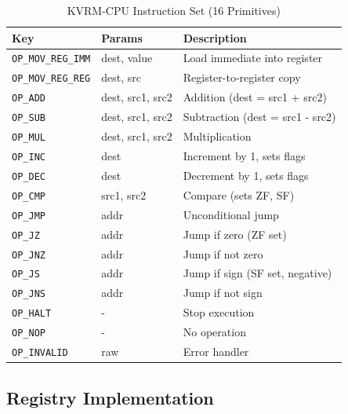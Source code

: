 \documentclass[11pt,a4paper]{article}
\begin{document}
\begin{table}[h]
\centering
\begin{tabular}{llp{6cm}}
\toprule
\textbf{Key} & \textbf{Params} & \textbf{Description} \\
\midrule
\texttt{OP\_MOV\_REG\_IMM} & dest, value & Load immediate into register \\
\texttt{OP\_MOV\_REG\_REG} & dest, src & Register-to-register copy \\
\texttt{OP\_ADD} & dest, src1, src2 & Addition (dest = src1 + src2) \\
\texttt{OP\_SUB} & dest, src1, src2 & Subtraction (dest = src1 - src2) \\
\texttt{OP\_MUL} & dest, src1, src2 & Multiplication \\
\texttt{OP\_INC} & dest & Increment by 1, sets flags \\
\texttt{OP\_DEC} & dest & Decrement by 1, sets flags \\
\texttt{OP\_CMP} & src1, src2 & Compare (sets ZF, SF) \\
\texttt{OP\_JMP} & addr & Unconditional jump \\
\texttt{OP\_JZ} & addr & Jump if zero (ZF set) \\
\texttt{OP\_JNZ} & addr & Jump if not zero \\
\texttt{OP\_JS} & addr & Jump if sign (SF set, negative) \\
\texttt{OP\_JNS} & addr & Jump if not sign \\
\texttt{OP\_HALT} & - & Stop execution \\
\texttt{OP\_NOP} & - & No operation \\
\texttt{OP\_INVALID} & raw & Error handler \\
\bottomrule
\end{tabular}
\caption{KVRM-CPU Instruction Set (16 Primitives)}
\end{table}

\subsection{Registry Implementation}
\end{document}
